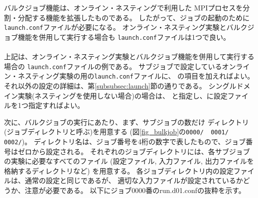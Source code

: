 バルクジョブ機能は、オンライン・ネスティングで利用した
MPIプロセスを分割・分配する機能を拡張したものである。
したがって、ジョブの起動のために\verb|launch.conf|ファイルが必要になる。
オンライン・ネスティング実験とバルクジョブ機能を併用して実行する場合も
\verb|launch.conf|ファイルは1つで良い。\\

\\

\noindent 上記は、オンライン・ネスティング実験とバルクジョブ機能を併用して実行する場合の
\verb|launch.conf|ファイルの例である。
サブジョブで設定しているオンライン・ネスティング実験の用の\verb|launch.conf|ファイルに、
の項目を加えればよい。
それ以外の設定の詳細は、第\ref{subsubsec:launch}節の通りである。
シングルドメイン実験(ネスティングを使用しない場合)の場合は、
と指定し、に設定ファイルを1つ指定すればよい。


次に、バルクジョブの実行にあたり、まず、サブジョブの数だけ
ディレクトリ(ジョブディレクトリと呼ぶ)を用意する
(図\ref{fig_bulkjob}の\verb|0000/  0001/  0002/|)。
ディレクトリ名は、ジョブ番号を4桁の数字で表したもので、ジョブ番号はゼロから設定される。
それぞれのジョブディレクトリには、各サブジョブの実験に必要なすべてのファイル
(設定ファイル, 入力ファイル, 出力ファイルを格納するディレクトリなど) を用意する。
%
各ジョブディレクトリ内の設定ファイルは、通常の設定と同じであるが、
適切な入力ファイルが設定されているかどうか、注意が必要である。
以下にジョブ0000番のrun.d01.confの抜粋を示す。\\



